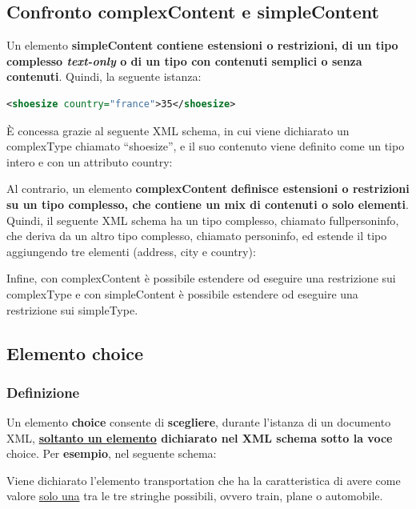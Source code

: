 \documentclass[a4paper]{article}
\newcommand{\dquotes}[1]{``#1''}
\begin{document}
	\subsection{Confronto \textsf{complexContent} e \textsf{simpleContent}}\label{par: Confronto complexContent e simpleContent}
	
	Un elemento \textcolor{Red3}{\textbf{\textsf{simpleContent}}} \textbf{contiene estensioni o restrizioni, di un tipo complesso \emph{text-only} o di un tipo con contenuti semplici o senza contenuti}. Quindi, la seguente istanza:
	\begin{lstlisting}[language=XML]
<shoesize country="france">35</shoesize>\end{lstlisting}
	È concessa grazie al seguente XML schema, in cui viene dichiarato un \textsf{complexType} chiamato \dquotes{shoesize}, e il suo contenuto viene definito come un tipo intero e con un attributo \textsf{country}:
	\:\newline
	
	\noindent
	Al contrario, un elemento \textcolor{Red3}{\textbf{\textsf{complexContent}}} \textbf{definisce estensioni o restrizioni su un tipo complesso, che contiene un mix di contenuti o solo elementi}. Quindi, il seguente XML schema ha un tipo complesso, chiamato \textsf{fullpersoninfo}, che deriva da un altro tipo complesso, chiamato \textsf{personinfo}, ed estende il tipo aggiungendo tre elementi (\textsf{address}, \textsf{city} e \textsf{country}):
	
	Infine, con \textsf{complexContent} è possibile estendere od eseguire una restrizione sui \textsf{complexType} e con \textsf{simpleContent} è possibile estendere od eseguire una restrizione sui \textsf{simpleType}.\newpage
	
	\subsection{Elemento \textsf{choice}}
	
	\subsubsection{Definizione}
	
	Un elemento \textcolor{Red3}{\textbf{\textsf{choice}}} consente di \textbf{scegliere}, durante l'istanza di un documento XML, \textbf{\underline{soltanto un elemento} dichiarato nel XML schema sotto la voce} \textsf{choice}. Per \textcolor{Green4}{\textbf{esempio}}, nel seguente schema:
	
	Viene dichiarato l'elemento \textsf{transportation} che ha la caratteristica di avere come valore \underline{solo una} tra le tre stringhe possibili, ovvero \textsf{train}, \textsf{plane} o \textsf{automobile}.
	
\end{document}

